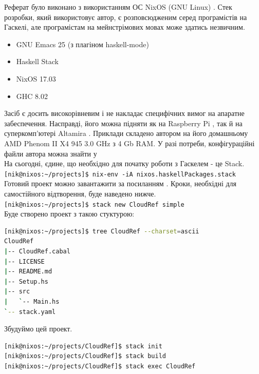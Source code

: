 \documentclass[12pt]{article}
\begin{document}
Реферат було виконано з використанням ОС NixOS (GNU Linux) \cite{nixos}. Стек розробки, який використовує автор, 
є розповсюдженим серед програмістів на Гаскелі, але програмістам на мейнстрімових мовах може здатись незвичним.

\begin{itemize}
\item GNU Emacs 25 (з плагіном haskell-mode)
\item Haskell Stack
\item NixOS 17.03
\item GHC 8.02
\end{itemize}

Засіб є досить високорівневим і не накладає специфічних вимог на апаратне забеспечення. Насправді, його можна 
підняти як на Raspberry Pi \cite{cloudPi}, так й на суперкомп'ютері Altamira \cite{Altamira}. Приклади складено 
автором на його домашньому AMD Phenom II X4 945 3.0 GHz з 4 Gb RAM. У разі потреби, конфігураційні файли автора 
можна знайти у \cite{dotfiles}\\

На сьогодні, єдине, що необхідно для початку роботи з Гаскелем - це Stack.\\

\lstinline{[nik@nixos:~/projects]$ nix-env -iA nixos.haskellPackages.stack}\\

Готовий проект можно завантажити за посиланням \cite{sources}. Кроки, необхідні для самостійного відтворення, 
буде наведено нижче.\\

\lstinline{[nik@nixos:~/projects]$ stack new CloudRef simple}\\

Буде створено проект з такою стуктурою:

\begin{lstlisting}[language=bash, caption={Структура початкового проекту}]
[nik@nixos:~/projects]$ tree CloudRef --charset=ascii
CloudRef
|-- CloudRef.cabal
|-- LICENSE
|-- README.md
|-- Setup.hs
|-- src
|   `-- Main.hs
`-- stack.yaml
\end{lstlisting}

Збудуймо цей проект.

\begin{lstlisting}[language=bash, caption={Будування та запуск проекту}]
[nik@nixos:~/projects/CloudRef]$ stack init
[nik@nixos:~/projects/CloudRef]$ stack build
[nik@nixos:~/projects/CloudRef]$ stack exec CloudRef
\end{lstlisting}
\end{document}
